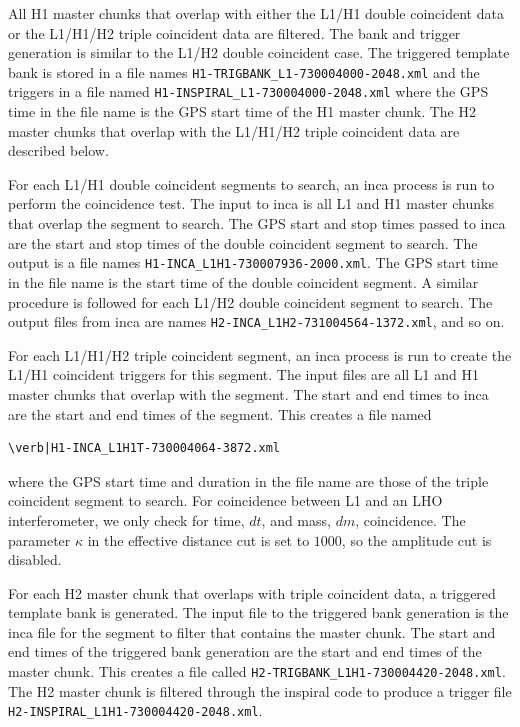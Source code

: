 All H1 master chunks that overlap with either the L1/H1 double coincident data
or the L1/H1/H2 triple coincident data are filtered. The bank and trigger
generation is similar to the L1/H2 double coincident case. The triggered
template bank is stored in a file names
\verb|H1-TRIGBANK_L1-730004000-2048.xml| and the triggers in a file named
\verb|H1-INSPIRAL_L1-730004000-2048.xml| where the GPS time in the file name
is the GPS start time of the H1 master chunk. The H2 master chunks that
overlap with the L1/H1/H2 triple coincident data are described below.

For each L1/H1 double coincident segments to search, an inca process is run to
perform the coincidence test. The input to inca is all L1 and H1 master chunks
that overlap the segment to search. The GPS start and stop times passed to
inca are the start and stop times of the double coincident segment to search.
The output is a file names \verb|H1-INCA_L1H1-730007936-2000.xml|. The GPS
start time in the file name is the start time of the double coincident
segment.  A similar procedure is followed for each L1/H2 double coincident
segment to search. The output files from inca are names
\verb|H2-INCA_L1H2-731004564-1372.xml|, and so on.

For each L1/H1/H2 triple coincident segment, an inca process is run to create
the L1/H1 coincident triggers for this segment. The input files are all L1 and
H1 master chunks that overlap with the segment. The start and end times to
inca are the start and end times of the segment. This creates a file named
\begin{verbatim}
\verb|H1-INCA_L1H1T-730004064-3872.xml
\end{verbatim}
where the GPS start time and duration in the file name are those of the triple
coincident segment to search.  For coincidence between L1 and an LHO
interferometer, we only check for time, $dt$, and mass, $dm$, coincidence.
The parameter $\kappa$ in the effective distance cut is set to $1000$, so the
amplitude cut is disabled.

For each H2 master chunk that overlaps with triple coincident data, a triggered
template bank is generated. The input file to the triggered bank generation is
the inca file for the segment to filter that contains the master chunk. The
start and end times of the triggered bank generation are the start and end
times of the master chunk. This creates a file called
\verb|H2-TRIGBANK_L1H1-730004420-2048.xml|.  The H2 master chunk is filtered
through the inspiral code to produce a trigger file
\verb|H2-INSPIRAL_L1H1-730004420-2048.xml|.
 

